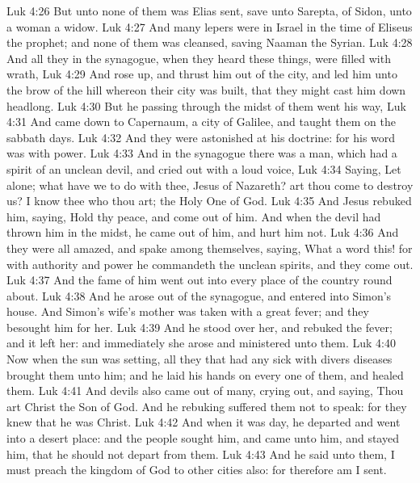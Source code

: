 \vs Luk 4:26 But unto none of them was Elias sent, save unto Sarepta,  of Sidon, unto a woman  a widow.
\vs Luk 4:27 And many lepers were in Israel in the time of Eliseus the prophet; and none of them was cleansed, saving Naaman the Syrian.
\vs Luk 4:28 And all they in the synagogue, when they heard these things, were filled with wrath,
\vs Luk 4:29 And rose up, and thrust him out of the city, and led him unto the brow of the hill whereon their city was built, that they might cast him down headlong.
\vs Luk 4:30 But he passing through the midst of them went his way,
\vs Luk 4:31 And came down to Capernaum, a city of Galilee, and taught them on the sabbath days.
\vs Luk 4:32 And they were astonished at his doctrine: for his word was with power.
\vs Luk 4:33 And in the synagogue there was a man, which had a spirit of an unclean devil, and cried out with a loud voice,
\vs Luk 4:34 Saying, Let  alone; what have we to do with thee,  Jesus of Nazareth? art thou come to destroy us? I know thee who thou art; the Holy One of God.
\vs Luk 4:35 And Jesus rebuked him, saying, Hold thy peace, and come out of him. And when the devil had thrown him in the midst, he came out of him, and hurt him not.
\vs Luk 4:36 And they were all amazed, and spake among themselves, saying, What a word  this! for with authority and power he commandeth the unclean spirits, and they come out.
\vs Luk 4:37 And the fame of him went out into every place of the country round about.
\vs Luk 4:38 And he arose out of the synagogue, and entered into Simon's house. And Simon's wife's mother was taken with a great fever; and they besought him for her.
\vs Luk 4:39 And he stood over her, and rebuked the fever; and it left her: and immediately she arose and ministered unto them.
\vs Luk 4:40 Now when the sun was setting, all they that had any sick with divers diseases brought them unto him; and he laid his hands on every one of them, and healed them.
\vs Luk 4:41 And devils also came out of many, crying out, and saying, Thou art Christ the Son of God. And he rebuking  suffered them not to speak: for they knew that he was Christ.
\vs Luk 4:42 And when it was day, he departed and went into a desert place: and the people sought him, and came unto him, and stayed him, that he should not depart from them.
\vs Luk 4:43 And he said unto them, I must preach the kingdom of God to other cities also: for therefore am I sent.
